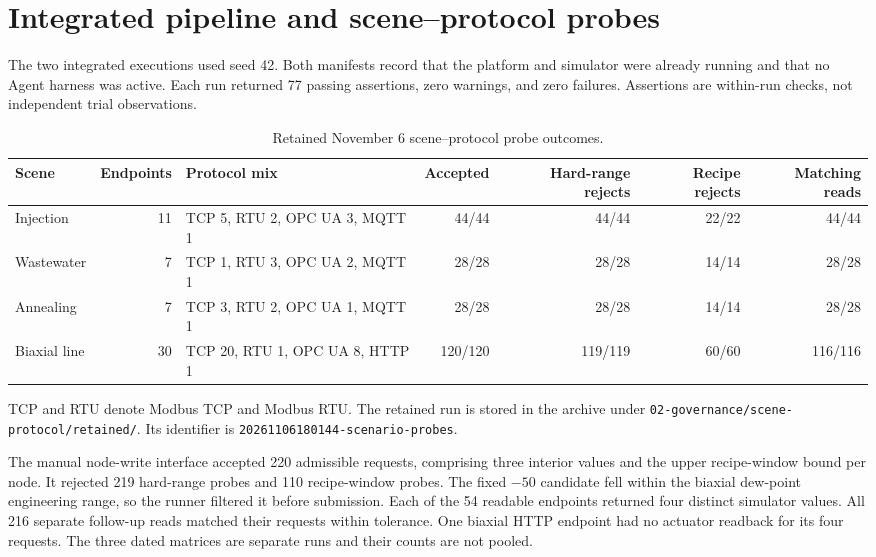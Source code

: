 \documentclass[10pt]{article}
\begin{document}
\section*{Integrated pipeline and scene--protocol probes}
The two integrated executions used seed 42. Both manifests record that the platform and simulator were already running and that no Agent harness was active. Each run returned 77 passing assertions, zero warnings, and zero failures. Assertions are within-run checks, not independent trial observations.

\begin{table}[htbp]
\centering
\caption{Retained November 6 scene--protocol probe outcomes.}
\scriptsize
\setlength{\tabcolsep}{1.5pt}
\begin{tabularx}{\textwidth}{@{}>{\raggedright\arraybackslash}p{1.55cm}r >{\raggedright\arraybackslash}X r r r r@{}}
\toprule
Scene & Endpoints & Protocol mix & Accepted & Hard-range rejects & Recipe rejects & Matching reads \\
\midrule
Injection & 11 & TCP 5, RTU 2, OPC UA 3, MQTT 1 & 44/44 & 44/44 & 22/22 & 44/44 \\
Wastewater & 7 & TCP 1, RTU 3, OPC UA 2, MQTT 1 & 28/28 & 28/28 & 14/14 & 28/28 \\
Annealing & 7 & TCP 3, RTU 2, OPC UA 1, MQTT 1 & 28/28 & 28/28 & 14/14 & 28/28 \\
Biaxial line & 30 & TCP 20, RTU 1, OPC UA 8, HTTP 1 & 120/120 & 119/119 & 60/60 & 116/116 \\
\bottomrule
\end{tabularx}
\end{table}

TCP and RTU denote Modbus TCP and Modbus RTU. The retained run is stored in the archive under \nolinkurl{02-governance/scene-protocol/retained/}. Its identifier is \nolinkurl{20261106180144-scenario-probes}.

The manual node-write interface accepted 220 admissible requests, comprising three interior values and the upper recipe-window bound per node. It rejected 219 hard-range probes and 110 recipe-window probes. The fixed $-50$ candidate fell within the biaxial dew-point engineering range, so the runner filtered it before submission. Each of the 54 readable endpoints returned four distinct simulator values. All 216 separate follow-up reads matched their requests within tolerance. One biaxial HTTP endpoint had no actuator readback for its four requests. The three dated matrices are separate runs and their counts are not pooled.
\end{document}
